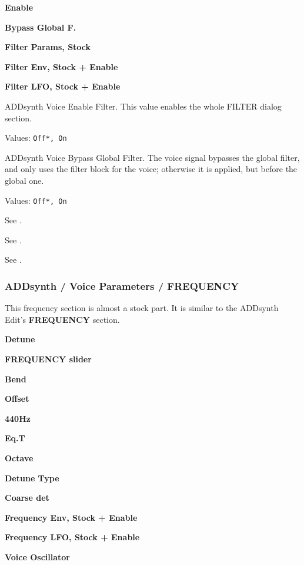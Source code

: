    \begin{enumber}
      \item \textbf{Enable}
      \item \textbf{Bypass Global F.}
      \item \textbf{Filter Params, Stock}
      \item \textbf{Filter Env, Stock + Enable}
      \item \textbf{Filter LFO, Stock + Enable}
   \end{enumber}

   \setcounter{ItemCounter}{0}      %

   ADDsynth Voice Enable Filter.
   This value enables the whole FILTER dialog section.

   Values: \texttt{Off*, On}

   ADDsynth Voice Bypass Global Filter.
   The voice signal bypasses the global filter,
   and only uses the filter block for the voice;
   otherwise it is applied, but before the global one.

   Values: \texttt{Off*, On}

   See .

   See .

   See .

\subsubsection{ADDsynth / Voice Parameters / FREQUENCY}
\label{subsubsec:addsynth_voice_parameters_frequency}

   This frequency section is almost a stock part.
   It is similar to the ADDsynth Edit's \textbf{FREQUENCY} section.

   \begin{enumber}
      \item \textbf{Detune}
      \item \textbf{FREQUENCY slider}
      \item \textbf{Bend}
      \item \textbf{Offset}
      \item \textbf{440Hz}          %
      \item \textbf{Eq.T}          %
      \item \textbf{Octave}
      \item \textbf{Detune Type}
      \item \textbf{Coarse det}
      \item \textbf{Frequency Env, Stock + Enable}
      \item \textbf{Frequency LFO, Stock + Enable}
      \item \textbf{Voice Oscillator}
   \end{enumber}

